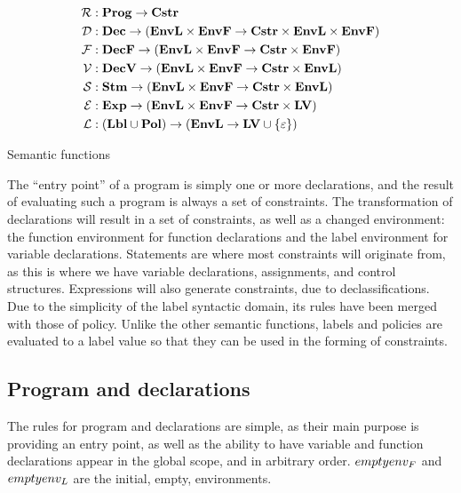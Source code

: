 \begin{table}[H]
\begin{align*}
  \mathcal{R} & : \mathbf{Prog} \rightarrow \mathbf{Cstr} \\
  \mathcal{D} & : \mathbf{Dec} \rightarrow (\mathbf{EnvL} \times \mathbf{EnvF} \rightarrow \mathbf{Cstr} \times \mathbf{EnvL} \times \mathbf{EnvF}) \\
  \mathcal{F} & : \mathbf{DecF} \rightarrow (\mathbf{EnvL} \times \mathbf{EnvF} \rightarrow \mathbf{Cstr} \times \mathbf{EnvF}) \\
  \mathcal{V} & : \mathbf{DecV} \rightarrow (\mathbf{EnvL} \times \mathbf{EnvF} \rightarrow \mathbf{Cstr} \times \mathbf{EnvL}) \\
  \mathcal{S} & : \mathbf{Stm} \rightarrow (\mathbf{EnvL} \times \mathbf{EnvF} \rightarrow \mathbf{Cstr} \times \mathbf{EnvL}) \\
  \mathcal{E} & : \mathbf{Exp} \rightarrow (\mathbf{EnvL} \times \mathbf{EnvF} \rightarrow \mathbf{Cstr} \times \mathbf{LV}) \\
  \mathcal{L} & : (\mathbf{Lbl} \cup \mathbf{Pol}) \rightarrow (\mathbf{EnvL} \rightarrow \mathbf{LV} \cup \{ \varepsilon \})
\end{align*}
\caption{Semantic functions}
\label{cstr:semantic_functions}
\end{table}

The ``entry point'' of a \thelang{} program is simply one or more declarations, and the result of evaluating such a program is always a set of constraints.
The transformation of declarations will result in a set of constraints, as well as a changed environment: the function environment for function declarations and the label environment for variable declarations.
Statements are where most constraints will originate from, as this is where we have variable declarations, assignments, and control structures.
Expressions will also generate constraints, due to declassifications.
Due to the simplicity of the label syntactic domain, its rules have been merged with those of policy.
Unlike the other semantic functions, labels and policies are evaluated to a label value so that they can be used in the forming of constraints.

\subsection{Program and declarations}
The rules for program and declarations are simple, as their main purpose is providing an entry point, as well as the ability to have variable and function declarations appear in the global scope, and in arbitrary order.
$empty{env_F}$ and $empty{env_L}$ are the initial, empty, environments.

